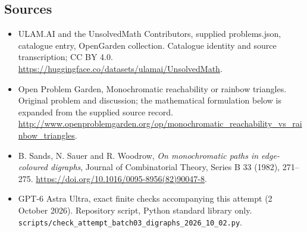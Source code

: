 \documentclass[11pt,a4paper]{article}
\begin{document}
\subsection{Sources}
\begin{itemize}
\item[S1] ULAM.AI and the UnsolvedMath Contributors, supplied problems.json, catalogue entry, OpenGarden collection. Catalogue identity and source transcription; CC BY 4.0.
\url{https://huggingface.co/datasets/ulamai/UnsolvedMath}.
\item[S2] Open Problem Garden, Monochromatic reachability or rainbow triangles. Original problem and discussion; the mathematical formulation below is expanded from the supplied source record.
\url{http://www.openproblemgarden.org/op/monochromatic_reachability_vs_rainbow_triangles}.
\item[S3] B. Sands, N. Sauer and R. Woodrow, \emph{On monochromatic paths in edge-coloured digraphs}, Journal of Combinatorial Theory, Series B 33 (1982), 271--275. \url{https://doi.org/10.1016/0095-8956(82)90047-8}.
\item[S9] GPT-6 Astra Ultra, exact finite checks accompanying this attempt (2 October 2026). Repository script, Python standard library only. \texttt{scripts/check\_attempt\_batch03\_digraphs\_2026\_10\_02.py}.
\end{itemize}
\end{document}
